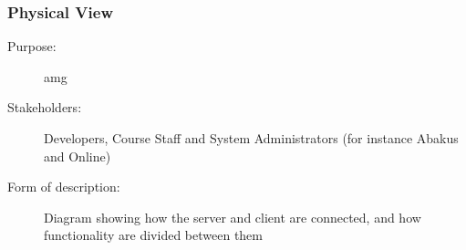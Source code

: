 \subsubsection{Physical View}
\begin{description}
  \item[Purpose:]{amg}
  \item[Stakeholders:]{Developers, Course Staff and System Administrators (for
    instance Abakus and Online)}
  \item[Form of description:]{Diagram showing how the server and client are
    connected, and how functionality are divided between them}
\end{description}

